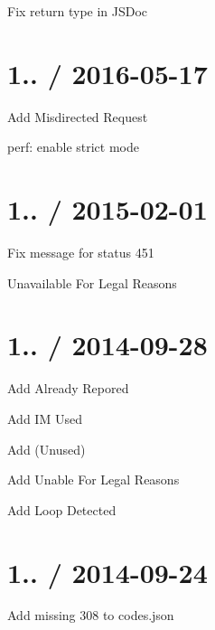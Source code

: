 
\begin{DoxyItemize}
\item Fix return type in J\+S\+Doc
\end{DoxyItemize}

\section*{1.. / 2016-\/05-\/17 }


\begin{DoxyItemize}
\item Add { Misdirected Request}
\item perf\+: enable strict mode
\end{DoxyItemize}

\section*{1.. / 2015-\/02-\/01 }


\begin{DoxyItemize}
\item Fix message for status 451
\begin{DoxyItemize}
\item { Unavailable For Legal Reasons}
\end{DoxyItemize}
\end{DoxyItemize}

\section*{1.. / 2014-\/09-\/28 }


\begin{DoxyItemize}
\item Add { Already Repored}
\item Add { IM Used}
\item Add { (Unused)}
\item Add { Unable For Legal Reasons}
\item Add { Loop Detected}
\end{DoxyItemize}

\section*{1.. / 2014-\/09-\/24 }


\begin{DoxyItemize}
\item Add missing 308 to {\ttfamily codes.\+json}
\end{DoxyItemize}

